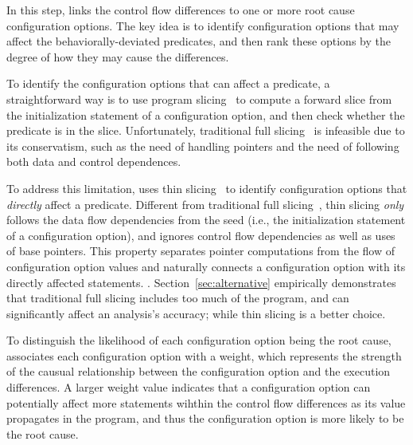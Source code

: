 


In this step, \ourtool links the control flow differences
to one or more root cause configuration options.
The key idea is to identify configuration options that
may affect the behaviorally-deviated predicates, and then rank
these options by the degree of how they may cause
the differences.


To identify the configuration options that can affect
a predicate, a straightforward way is to use program slicing~\cite{}
to compute a forward slice from the initialization statement
of a configuration option, and then check whether the predicate is
in the slice. Unfortunately, traditional
full slicing~\cite{} is infeasible due
to its conservatism, such as the need of handling pointers
and the need of following both data and control dependences.


To address this limitation, \ourtool uses thin slicing~\cite{}
to identify configuration options that \textit{directly} affect
a predicate. Different from traditional full slicing~\cite{},
thin slicing \textit{only} follows the data flow dependencies
from the seed (i.e., the initialization statement of a
configuration option), and ignores control flow dependencies
as well as uses of base pointers. This property separates
pointer computations from the flow of configuration option
values and naturally connects a configuration option with its
directly affected statements. . Section~\ref{sec:alternative}
empirically demonstrates that traditional full slicing includes
too much of the program, and can significantly affect an analysis's
accuracy; while thin slicing is a better
choice.


To distinguish the likelihood of each configuration
option being the root cause, \ourtool associates each
configuration option with a weight, which represents the strength of
the causual relationship between the configuration option
and the execution differences.
A larger weight value indicates that a configuration option
can potentially affect more statements wihthin the control
flow differences as its value propagates in the program, and thus
the configuration option is more likely
to be the root cause.

